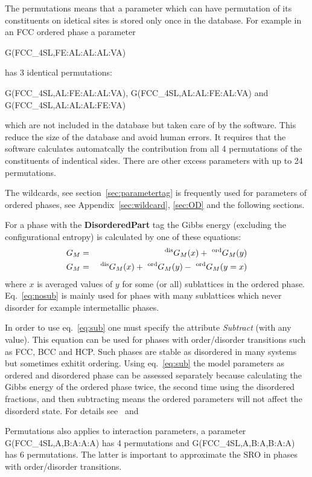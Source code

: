 \documentclass{article}
\begin{document}
The permutations means that a parameter which can have permutation of
its constituents on idetical sites is stored only once in the
database.  For example in an FCC ordered phase a parameter

G(FCC\_4SL,FE:AL:AL:AL:VA)

\noindent
has 3 identical permutations:

\noindent
G(FCC\_4SL,AL:FE:AL:AL:VA), G(FCC\_4SL,AL:AL:FE:AL:VA) and
G(FCC\_4SL,AL:AL:AL:FE:VA)

\noindent
which are not included in the database but taken care of by the
software.  This reduce the size of the database and avoid human
errors.  It requires that the software calculates automatcally the
contribution from all 4 permutations of the constituents of indentical
sides.  There are other excess parameters with up to 24 permutations.

The wildcards, see section~\ref{sec:parametertag} is frequently used
for parameters of ordered phases, see Appendix~\ref{sec:wildcard},
\ref{sec:OD} and the following sections.

For a phase with the {\bf DisorderedPart} tag the Gibbs energy
(excluding the configurational entropy) is calculated by one of these
equations:
\begin{eqnarray}
G_M &=& ~^{\rm dis}G_M(x) + ~^{\rm ord}G_M(y) \label{eq:nosub}\\
G_M &=& ~^{\rm dis}G_M(x) + ~^{\rm ord}G_M(y) - ~^{\rm ord}G_M(y=x) \label{eq:sub}
\end{eqnarray}
where $x$ is averaged values of $y$ for some (or all) sublattices in
the ordered phase.  Eq.~\ref{eq:nosub} is mainly used for phaes with
many sublattices which never disorder for example intermetallic
phases.

In order to use eq.~\ref{eq:sub} one must specify the attribute {\em
  Subtract} (with any value).  This equation can be used for phases
with order/disorder transitions such as FCC, BCC and HCP.  Such phases
are stable as disordered in many systems but sometimes exhitit
ordering.  Using eq.~\ref{eq:sub} the model parameters as ordered and
disordered phase can be assessed separately because calculating the
Gibbs energy of the ordered phase twice, the second time using the
disordered fractions, and then subtracting means the ordered
parameters will not affect the disorderd state.  For details
see~\cite{97Ans} and~\cite{07Hal}

Permutations also applies to interaction parameters, a parameter
G(FCC\_4SL,A,B:A:A:A) has 4 permutations and G(FCC\_4SL,A,B:A,B:A:A)
has 6 permutations.  The latter is important to approximate the SRO in
phases with order/disorder transitions.
\end{document}
